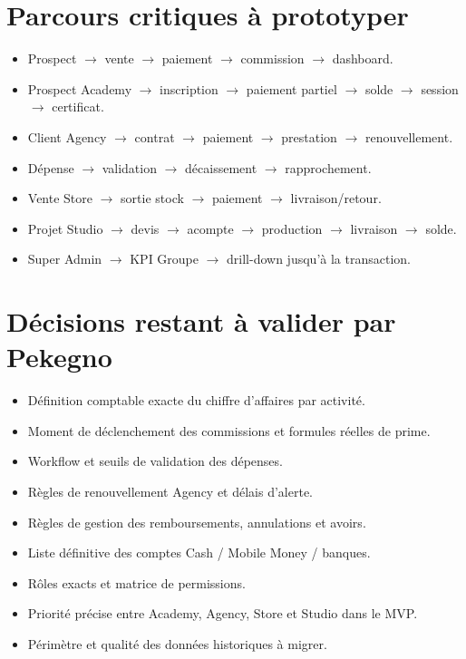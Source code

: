 \documentclass[11pt,a4paper]{article}
\begin{document}
\section{Parcours critiques à prototyper}

\begin{itemize}
  \item Prospect $\rightarrow$ vente $\rightarrow$ paiement $\rightarrow$ commission $\rightarrow$ dashboard.
  \item Prospect Academy $\rightarrow$ inscription $\rightarrow$ paiement partiel $\rightarrow$ solde $\rightarrow$ session $\rightarrow$ certificat.
  \item Client Agency $\rightarrow$ contrat $\rightarrow$ paiement $\rightarrow$ prestation $\rightarrow$ renouvellement.
  \item Dépense $\rightarrow$ validation $\rightarrow$ décaissement $\rightarrow$ rapprochement.
  \item Vente Store $\rightarrow$ sortie stock $\rightarrow$ paiement $\rightarrow$ livraison/retour.
  \item Projet Studio $\rightarrow$ devis $\rightarrow$ acompte $\rightarrow$ production $\rightarrow$ livraison $\rightarrow$ solde.
  \item Super Admin $\rightarrow$ KPI Groupe $\rightarrow$ drill-down jusqu'à la transaction.
\end{itemize}

\section{Décisions restant à valider par Pekegno}

\begin{itemize}
  \item Définition comptable exacte du chiffre d'affaires par activité.
  \item Moment de déclenchement des commissions et formules réelles de prime.
  \item Workflow et seuils de validation des dépenses.
  \item Règles de renouvellement Agency et délais d'alerte.
  \item Règles de gestion des remboursements, annulations et avoirs.
  \item Liste définitive des comptes Cash / Mobile Money / banques.
  \item Rôles exacts et matrice de permissions.
  \item Priorité précise entre Academy, Agency, Store et Studio dans le MVP.
  \item Périmètre et qualité des données historiques à migrer.
\end{itemize}
\end{document}

